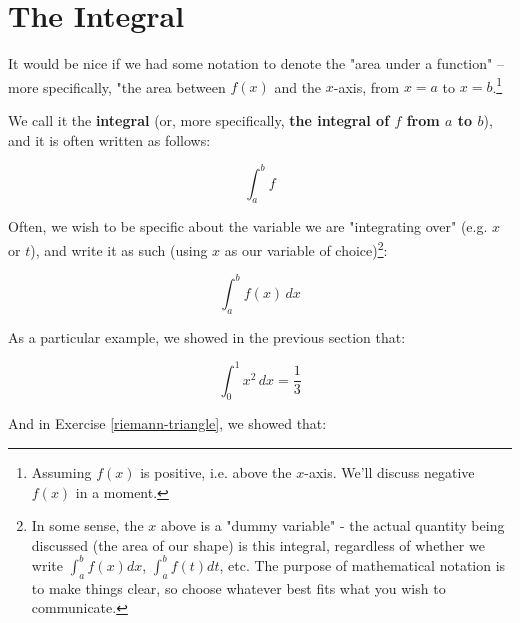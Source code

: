 \documentclass{book}
\begin{document}



\section{The Integral}

It would be nice if we had some notation to denote the "area under a function" -- more specifically, "the area between $f(x)$ and the $x$-axis, from $x = a$ to $x = b$.\footnote{Assuming $f(x)$ is positive, i.e. above the $x$-axis. We'll discuss negative $f(x)$ in a moment.} 


We call it the \textbf{integral} (or, more specifically, \textbf{the integral of $f$ from $a$ to $b$}), and it is often written as follows:

\begin{equation}
\int_{a}^{b} f
\end{equation}

Often, we wish to be specific about the variable we are "integrating over" (e.g. $x$ or $t$), and write it as such (using $x$ as our variable of choice)\footnote{In some sense, the $x$ above is a "dummy variable" - the actual quantity being discussed (the area of our shape) is this integral, regardless of whether we write $\int_{a}^{b} f(x) dx$, $\int_{a}^{b} f(t) dt$, etc. The purpose of mathematical notation is to make things clear, so choose whatever best fits what you wish to communicate.}:

\begin{equation}
\int_{a}^{b} f(x)\, dx
\end{equation}


As a particular example, we showed in the previous section that:

\begin{equation}
\int_{0}^{1} x^2\, dx = \frac{1}{3}
\end{equation}

And in Exercise \ref{riemann-triangle}, we showed that:
\end{document}
